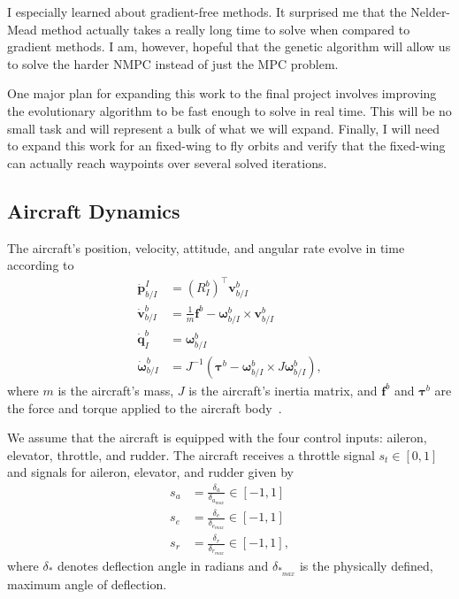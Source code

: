 \documentclass{article}
\begin{document}
I especially learned about gradient-free methods. It surprised me that the Nelder-Mead method actually takes a really long time to solve when compared to gradient methods. I am, however, hopeful that the genetic algorithm will allow us to solve the harder NMPC instead of just the MPC problem.

One major plan for expanding this work to the final project involves improving the evolutionary algorithm to be fast enough to solve in real time. This will be no small task and will represent a bulk of what we will expand. Finally, I will need to expand this work for an fixed-wing to fly orbits and verify that the fixed-wing can actually reach waypoints over several solved iterations.


\begin{appendices}
	
\section{Aircraft Dynamics}
\label{sec:dynamics}

The aircraft's position, velocity, attitude, and angular rate evolve in time according to
\begin{align}
\dot{\mathbf{p}}_{b/I}^{I} & =\left(R_{I}^{b}\right)^{\top}\mathbf{v}_{b/I}^{b}\label{eq:lqr_pdot_true}\\
\dot{\mathbf{v}}_{b/I}^{b} & =\frac{1}{m}\mathbf{f}^{b}-\boldsymbol{\omega}_{b/I}^{b}\times\mathbf{v}_{b/I}^{b}\label{eq:lqr_vdot_true}\\
\dot{\mathbf{q}}_{I}^{b} & =\boldsymbol{\omega}_{b/I}^{b}\label{eq:lqr_qdot_true}\\
\dot{\boldsymbol{\omega}}_{b/I}^{b} & =J^{-1}\left(\boldsymbol{\tau}^{b}-\boldsymbol{\omega}_{b/I}^{b}\times J\boldsymbol{\omega}_{b/I}^{b}\right),\label{eq:lqr_omegadot_true}
\end{align}
where $m$ is the aircraft's mass, $J$ is the aircraft's inertia matrix, and $\mathbf{f}^b$ and $\boldsymbol{\tau}^b$ are the force and torque applied to the aircraft body~\cite{beard2012small}.

We assume that the aircraft is equipped with the four control inputs: aileron, elevator, throttle, and rudder.
The aircraft receives a throttle signal $s_t\in\left[0,1\right]$ and signals for aileron, elevator, and rudder given by
\begin{align}
s_{a} &= \frac{\delta_{a}}{\delta_{a_{max}}}\in\left[-1,1\right] \\
s_{e} &= \frac{\delta_{e}}{\delta_{e_{max}}}\in\left[-1,1\right] \\
s_{r} &= \frac{\delta_{r}}{\delta_{r_{max}}}\in\left[-1,1\right],
\end{align}
where $\delta_*$ denotes deflection angle in radians and $\delta_{*_{max}}$ is the physically defined, maximum angle of deflection.


\end{appendices}
\end{document}
